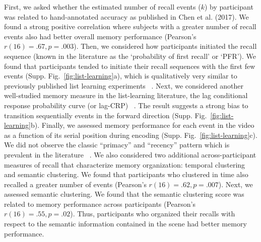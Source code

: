 \documentclass{article}
\begin{document}
First, we asked whether the estimated number of recall events ($k$) by participant was related to hand-annotated accuracy as published in Chen et al. (2017).  We found a strong positive correlation where subjects with a greater number of recall events also had better overall memory performance (Pearson's $r(16)=.67, p=.003$). Then, we considered how participants initiated the recall sequence (known in the literature as the `probability of first recall' or `PFR'). We found that participants tended to initiate their recall sequences with the first few events (Supp. Fig.~\ref{fig:list-learning}a), which is qualitatively very similar to previously published list learning experiments ~\citep{HowaKaha99}. Next, we considered another well-studied memory measure in the list-learning literature, the lag conditional response probability curve (or lag-CRP) ~\citep{Kaha96}. The result suggests a strong bias to transition sequentially events in the forward direction (Supp. Fig.~\ref{fig:list-learning}b). Finally, we assessed memory performance for each event in the video as a function of its serial position during encoding (Supp. Fig.~\ref{fig:list-learning}c). We did not observe the classic ``primacy'' and ``recency'' pattern which is prevalent in the literature ~\citep{Murd62a}. We also considered two additional across-participant measures of recall that characterize memory organization: temporal clustering and semantic clustering. We found that participants who clustered in time also recalled a greater number of events (Pearson's $r(16)=.62, p=.007$). Next, we assessed semantic clustering. We found that the semantic clustering score was related to memory performance across participants (Pearson's $r(16)=.55, p=.02$).  Thus, participants who organized their recalls with respect to the semantic information contained in the scene had better memory performance.
\end{document}
